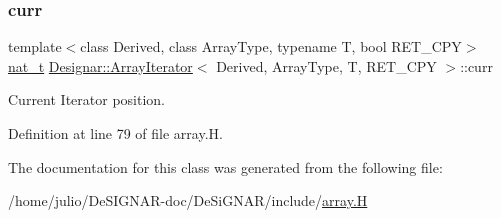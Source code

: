 \subsubsection{\texorpdfstring{curr}{curr}}
{\footnotesize\ttfamily template$<$class Derived, class Array\+Type, typename T, bool R\+E\+T\+\_\+\+C\+PY$>$ \\
\hyperlink{namespace_designar_aa72662848b9f4815e7bf31a7cf3e33d1}{nat\+\_\+t} \hyperlink{class_designar_1_1_array_iterator}{Designar\+::\+Array\+Iterator}$<$ Derived, Array\+Type, T, R\+E\+T\+\_\+\+C\+PY $>$\+::curr\hspace{0.3cm}{\ttfamily [protected]}}



Current Iterator position. 



Definition at line 79 of file array.\+H.



The documentation for this class was generated from the following file\+:\begin{DoxyCompactItemize}
\item 
/home/julio/\+De\+S\+I\+G\+N\+A\+R-\/doc/\+De\+Si\+G\+N\+A\+R/include/\hyperlink{array_8_h}{array.\+H}\end{DoxyCompactItemize}
